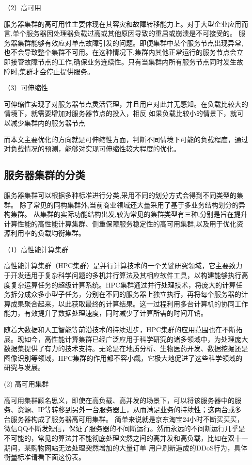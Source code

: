 （2）高可用

服务器集群的高可用性主要体现在其容灾和故障转移能力上\cite{刘金秀2019基于}。对于大型企业应用而言,单个服务器因处理器负载过高或其他原因导致的重启或崩溃是不可接受的。
服务器集群能够有效应对单点故障引发的问题。即便集群中某个服务节点出现异常,也不会导致整个集群不可用。在这种情况下,集群内其他正常运行的服务节点会立即接管故障节点的工作,确保业务连续性。只有当集群内所有服务节点同时发生故障时,集群才会停止提供服务。

（3）可伸缩性

可伸缩性实现了对服务器节点灵活管理，并且用户对此并无感知。在负载比较大的情境下，就需要增加对服务器节点的投入，相反
如果负载比较小的情景下，就可以减少集群内的服务器节点

而本文主要优化的方向就是可伸缩性方面，判断不同情境下可能的负载程度，通过对负载情况的预测，能够对实现可伸缩性较大程度的优化。

\subsection{服务器集群的分类}

服务器集群可以根据多种标准进行分类,采用不同的划分方式会得到不同类型的集群。
除了常见的同构集群外,当前商业领域还大量采用了基于多业务结构划分的异构集群。
从集群的实际功能结构出发,较为常见的集群类型有三种,分别是旨在提升计算性能的高性能计算集群、侧重保障服务稳定性的高可用集群,以及用于优化资源利用率的负载均衡集群\cite{刘卓2017基于Nginx的负载均衡集群设计与实现}。

（1）高性能计算集群

高性能计算集群（HPC集群）是并行计算技术的一个关键研究领域，它主要致力于开发适用于复杂科学问题的多机并行算法及其相应软件工具，以构建能够执行高度复杂运算任务的超级计算系统\cite{xuzongyu}。HPC集群通过并行处理技术，将庞大的计算任务拆分成众多小型子任务，分别在不同的服务器上独立执行，再将每个服务器的计算成果聚合起来，以此获取最终的计算结果。这一过程利用多台计算机的协同工作能力，有效提升了数据处理速度，同时减少了计算所需的时间开销。

随着大数据和人工智能等前沿技术的持续进步，HPC集群的应用范围也在不断拓展。现如今，高性能计算集群已经广泛应用于科学研究的诸多领域中，为处理庞大数据集提供了有力的技术支持。无论是在地质分析、生物医药开发、数据挖掘还是图像识别等领域，HPC集群的作用都不容小觑，它极大地促进了这些科学领域的研究与发展。

(2) 高可用集群

高可用集群顾名思义，即使在高负载、高并发的场景下，可以将该服务器中的服务、资源、IP等转移到另外一台服务器上，从而满足业务的持续性；这两台或多台服务器构成了服务器高可用集群。
简单来说就是京东淘宝24小时不断买买买，微信QQ不断发短信，保证了服务器的不间断运行。然而永远的不间断运行几乎是不可能的，常见的算法并不能彻底处理突然之间的高并发和高负载，比如在双十一期间，某购物网站无法处理突然增加的大量订单
用户刷新造成的DDoS行为，具体衡量标准请看下面这份表。

